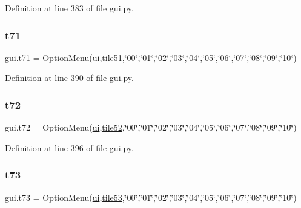 Definition at line 383 of file gui.\+py.

\mbox{\label{namespacegui_afdfbe202fdd7200450cbece171280f0f}} 
\subsubsection{\texorpdfstring{t71}{t71}}
{\footnotesize\ttfamily gui.\+t71 = Option\+Menu(\mbox{\hyperlink{namespacegui_a40ab7281456eadbea2dc2038f5c24fa1}{ui}},\mbox{\hyperlink{namespacegui_ad2c1b5064cba842f7abd0322229ca355}{tile51}},\char`\"{}00\char`\"{},\char`\"{}01\char`\"{},\char`\"{}02\char`\"{},\char`\"{}03\char`\"{},\char`\"{}04\char`\"{},\char`\"{}05\char`\"{},\char`\"{}06\char`\"{},\char`\"{}07\char`\"{},\char`\"{}08\char`\"{},\char`\"{}09\char`\"{},\char`\"{}10\char`\"{})}



Definition at line 390 of file gui.\+py.

\mbox{\label{namespacegui_af0b9877d396d85f925a283b2d7156f26}} 
\subsubsection{\texorpdfstring{t72}{t72}}
{\footnotesize\ttfamily gui.\+t72 = Option\+Menu(\mbox{\hyperlink{namespacegui_a40ab7281456eadbea2dc2038f5c24fa1}{ui}},\mbox{\hyperlink{namespacegui_a0a21b48dd64e7d0944745635aa9d8c8b}{tile52}},\char`\"{}00\char`\"{},\char`\"{}01\char`\"{},\char`\"{}02\char`\"{},\char`\"{}03\char`\"{},\char`\"{}04\char`\"{},\char`\"{}05\char`\"{},\char`\"{}06\char`\"{},\char`\"{}07\char`\"{},\char`\"{}08\char`\"{},\char`\"{}09\char`\"{},\char`\"{}10\char`\"{})}



Definition at line 396 of file gui.\+py.

\mbox{\label{namespacegui_aec09a0dd3818bd885a9460bce8ac9401}} 
\subsubsection{\texorpdfstring{t73}{t73}}
{\footnotesize\ttfamily gui.\+t73 = Option\+Menu(\mbox{\hyperlink{namespacegui_a40ab7281456eadbea2dc2038f5c24fa1}{ui}},\mbox{\hyperlink{namespacegui_a449b826a702e5cc4b285882012dd3d8a}{tile53}},\char`\"{}00\char`\"{},\char`\"{}01\char`\"{},\char`\"{}02\char`\"{},\char`\"{}03\char`\"{},\char`\"{}04\char`\"{},\char`\"{}05\char`\"{},\char`\"{}06\char`\"{},\char`\"{}07\char`\"{},\char`\"{}08\char`\"{},\char`\"{}09\char`\"{},\char`\"{}10\char`\"{})}



